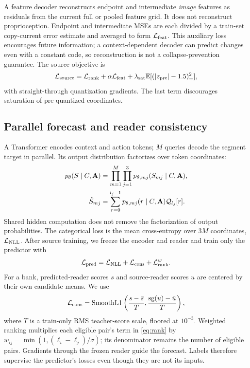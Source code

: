 A feature decoder reconstructs endpoint and intermediate \emph{image} features as residuals from the current full or pooled feature grid. It does not reconstruct proprioception. Endpoint and intermediate MSEs are each divided by a train-set copy-current error estimate and averaged to form $\mathcal L_{\rm feat}$. This auxiliary loss encourages future information; a context-dependent decoder can predict changes even with a constant code, so reconstruction is not a collapse-prevention guarantee. The source objective is
\begin{equation}
\mathcal L_{\rm source}=\mathcal L_{\rm rank}
+\alpha\mathcal L_{\rm feat}+\lambda_{\rm sat}\mathbb{E}[(|z_{\rm pre}|-1.5)_+^2],
\label{eq:source}
\end{equation}
with straight-through quantization gradients. The last term discourages saturation of pre-quantized coordinates.

\subsection{Parallel forecast and reader consistency}
\label{sec:wm}
A Transformer encodes context and action tokens; $M$ queries decode the segment target in parallel. Its output distribution factorizes over token coordinates:
\begin{align}
p_\theta(S\mid C,\mathbf{A})&=\prod_{m=1}^{M}\prod_{j=1}^{3}p_{\theta,mj}(S_{mj}\mid C,\mathbf{A}),\\
\hat S_{mj}&=\sum_{r=0}^{l_j-1}p_{\theta,mj}(r\mid C,\mathbf{A})\mathcal Q_{l_j}[r].
\label{eq:mean}
\end{align}
Shared hidden computation does not remove the factorization of output probabilities. The categorical loss is the mean cross-entropy over $3M$ coordinates, $\mathcal L_{\rm NLL}$. After source training, we freeze the encoder and reader and train only the predictor with
\begin{equation}
\mathcal L_{\rm pred}=\mathcal L_{\rm NLL}
+\mathcal L_{\rm cons}+\mathcal L_{\rm rank}^{w}.
\label{eq:pred}
\end{equation}
For a bank, predicted-reader scores $s$ and source-reader scores $u$ are centered by their own candidate means. We use
\begin{equation}
\mathcal L_{\rm cons}=\operatorname{SmoothL1}\left(
\frac{s-\bar s}{T},\frac{\operatorname{sg}(u)-\bar u}{T}\right),
\label{eq:cons}
\end{equation}
where $T$ is a train-only RMS teacher-score scale, floored at $10^{-3}$. Weighted ranking multiplies each eligible pair's term in \cref{eq:rank} by $w_{ij}=\min(1,(\ell_i-\ell_j)/\sigma)$; its denominator remains the number of eligible pairs. Gradients through the frozen reader guide the forecast. Labels therefore supervise the predictor's losses even though they are not its inputs.

